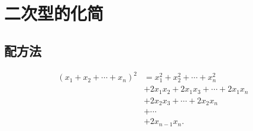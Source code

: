\documentclass[../../main.tex]{subfiles}%
\begin{document}
\section{二次型的化简}

\subsection{配方法}

\begin{lemma}
\begin{align*}
(x_1 + x_2 + \cdots + x_n)^2&=x_1^2 + x_2^2 + \cdots + x_n^2\\
&+ 2x_1x_2 + 2x_1x_3 + \cdots + 2x_1x_n\\
&+ 2x_2x_3 + \cdots + 2x_2x_n\\
&+ \cdots\\
&+ 2x_{n - 1}x_n.
\end{align*} 
\end{lemma}

\vspace{1cm}
\end{document}
